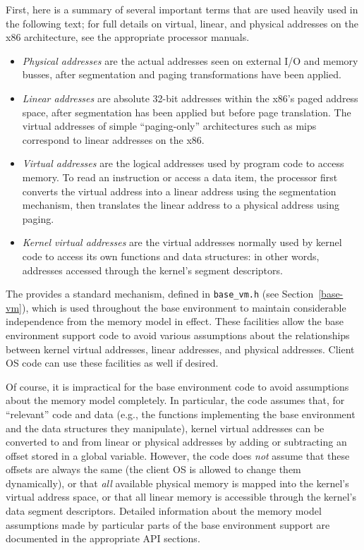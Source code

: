 First, here is a summary of several important terms
that are used heavily used in the following text;
for full details on virtual, linear, and physical addresses
on the x86 architecture,
see the appropriate processor manuals.
\begin{itemize}
\item	\emph{Physical addresses}
	are the actual addresses seen on external I/O and memory busses,
	after segmentation and paging transformations have been applied.
\item	\emph{Linear addresses}
	are absolute 32-bit addresses within the x86's paged address space,
	after segmentation has been applied but before page translation.
	The virtual addresses of simple ``paging-only'' architectures
	such as {\sc mips} correspond to linear addresses on the x86.
\item	\emph{Virtual addresses}
	are the logical addresses used by program code to access memory.
	To read an instruction or access a data item,
	the processor first converts the virtual address
	into a linear address using the segmentation mechanism,
	then translates the linear address to a physical address
	using paging.
\item	\emph{Kernel virtual addresses}
	are the virtual addresses normally used by kernel code
	to access its own functions and data structures:
	in other words,
	addresses accessed through the kernel's segment descriptors.
\end{itemize}

The \oskit{} provides a standard mechanism,
defined in {\tt base_vm.h} (see Section~\ref{base-vm}),
which is used throughout the base environment
to maintain considerable independence from the memory model in effect.
These facilities allow the base environment support code
to avoid various assumptions about
the relationships between kernel virtual addresses,
linear addresses, and physical addresses.
Client OS code can use these facilities as well if desired.

Of course, it is impractical for the base environment code
to avoid assumptions about the memory model completely.
In particular, the code assumes that,
for ``relevant'' code and data
(e.g., the functions implementing the base environment
and the data structures they manipulate),
kernel virtual addresses
can be converted to and from linear or physical addresses
by adding or subtracting an offset stored in a global variable.
However, the code does \emph{not} assume
that these offsets are always the same
(the client OS is allowed to change them dynamically),
or that \emph{all} available physical memory
is mapped into the kernel's virtual address space,
or that all linear memory is accessible
through the kernel's data segment descriptors.
Detailed information about the memory model assumptions
made by particular parts of the base environment support
are documented in the appropriate API sections.

